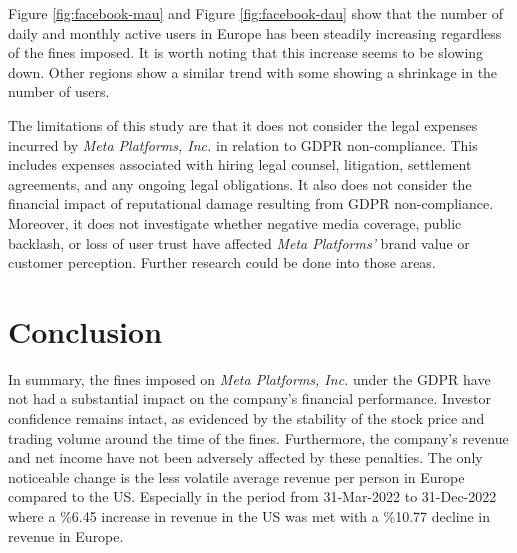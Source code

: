 \documentclass[12pt, a4paper]{article}
\begin{document}
Figure \ref{fig:facebook-mau} and Figure \ref{fig:facebook-dau} show that the
number of daily and monthly active users in Europe has been steadily increasing
regardless of the fines imposed. It is worth noting that this increase seems to
be slowing down. Other regions show a similar trend with some showing a
shrinkage in the number of users.


The limitations of this study are that it does not consider the legal expenses
incurred by \textit{Meta Platforms, Inc.} in relation to GDPR non-compliance.
This includes expenses associated with hiring legal counsel, litigation,
settlement agreements, and any ongoing legal obligations. It also does not
consider the financial impact of reputational damage resulting from GDPR
non-compliance. Moreover, it does not investigate whether negative media
coverage, public backlash, or loss of user trust have affected \textit{Meta
Platforms'} brand value or customer perception. Further research could be done
into those areas.
\section*{Conclusion}

In summary, the fines imposed on \textit{Meta Platforms, Inc.} under the GDPR
have not had a substantial impact on the company's financial performance.
Investor confidence remains intact, as evidenced by the stability of the stock
price and trading volume around the time of the fines. Furthermore, the
company's revenue and net income have not been adversely affected by these
penalties. The only noticeable change is the less volatile average revenue per
person in Europe compared to the US. Especially in the period from 31-Mar-2022
to 31-Dec-2022 where a \%6.45 increase in revenue in the US was met with a
\%10.77 decline in revenue in Europe.



\end{document}
